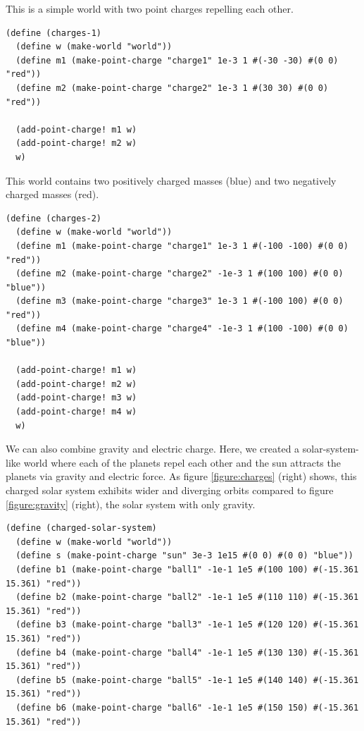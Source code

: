 \documentclass{article}
\begin{document}

This is a simple world with two point charges repelling each other.

{\small\begin{verbatim}
(define (charges-1)
  (define w (make-world "world"))
  (define m1 (make-point-charge "charge1" 1e-3 1 #(-30 -30) #(0 0) "red"))
  (define m2 (make-point-charge "charge2" 1e-3 1 #(30 30) #(0 0) "red"))

  (add-point-charge! m1 w)
  (add-point-charge! m2 w)
  w)
\end{verbatim}}


This world contains two positively charged masses (blue) and two negatively
charged masses (red).

{\small\begin{verbatim}
(define (charges-2)
  (define w (make-world "world"))
  (define m1 (make-point-charge "charge1" 1e-3 1 #(-100 -100) #(0 0) "red"))
  (define m2 (make-point-charge "charge2" -1e-3 1 #(100 100) #(0 0) "blue"))
  (define m3 (make-point-charge "charge3" 1e-3 1 #(-100 100) #(0 0) "red"))
  (define m4 (make-point-charge "charge4" -1e-3 1 #(100 -100) #(0 0) "blue"))

  (add-point-charge! m1 w)
  (add-point-charge! m2 w)
  (add-point-charge! m3 w)
  (add-point-charge! m4 w)
  w)
\end{verbatim}}


We can also combine gravity and electric charge. Here, we created a solar-system-like world where each of the planets repel each other and the sun attracts the planets via gravity and electric force. As figure \ref{figure:charges} (right) shows, this charged solar system exhibits wider and diverging orbits compared to figure \ref{figure:gravity} (right), the solar system with only gravity.

{\small\begin{verbatim}
(define (charged-solar-system)
  (define w (make-world "world"))
  (define s (make-point-charge "sun" 3e-3 1e15 #(0 0) #(0 0) "blue"))
  (define b1 (make-point-charge "ball1" -1e-1 1e5 #(100 100) #(-15.361 15.361) "red"))
  (define b2 (make-point-charge "ball2" -1e-1 1e5 #(110 110) #(-15.361 15.361) "red"))
  (define b3 (make-point-charge "ball3" -1e-1 1e5 #(120 120) #(-15.361 15.361) "red"))
  (define b4 (make-point-charge "ball4" -1e-1 1e5 #(130 130) #(-15.361 15.361) "red"))
  (define b5 (make-point-charge "ball5" -1e-1 1e5 #(140 140) #(-15.361 15.361) "red"))
  (define b6 (make-point-charge "ball6" -1e-1 1e5 #(150 150) #(-15.361 15.361) "red"))

\end{verbatim}}
\end{document}
